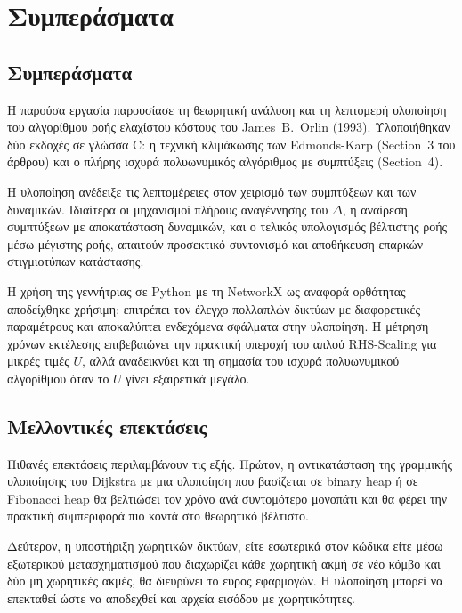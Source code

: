 \documentclass[11pt,a4paper,oneside]{report}
\begin{document}
\chapter{Συμπεράσματα}

\section{Συμπεράσματα}

Η παρούσα εργασία παρουσίασε τη θεωρητική ανάλυση και τη λεπτομερή υλοποίηση του αλγορίθμου ροής ελαχίστου κόστους του \textenglish{James~B.~Orlin} (1993). Υλοποιήθηκαν δύο εκδοχές σε γλώσσα \textenglish{C}: η τεχνική κλιμάκωσης των \textenglish{Edmonds-Karp} (\textenglish{Section~3} του άρθρου) και ο πλήρης ισχυρά πολυωνυμικός αλγόριθμος με συμπτύξεις (\textenglish{Section~4}).

Η υλοποίηση ανέδειξε τις λεπτομέρειες στον χειρισμό των συμπτύξεων και των δυναμικών. Ιδιαίτερα οι μηχανισμοί πλήρους αναγέννησης του $\Delta$, η αναίρεση συμπτύξεων με αποκατάσταση δυναμικών, και ο τελικός υπολογισμός βέλτιστης ροής μέσω μέγιστης ροής, απαιτούν προσεκτικό συντονισμό και αποθήκευση επαρκών στιγμιοτύπων κατάστασης.

Η χρήση της γεννήτριας σε \textenglish{Python} με τη \textenglish{NetworkX} ως αναφορά ορθότητας αποδείχθηκε χρήσιμη: επιτρέπει τον έλεγχο πολλαπλών δικτύων με διαφορετικές παραμέτρους και αποκαλύπτει ενδεχόμενα σφάλματα στην υλοποίηση. Η μέτρηση χρόνων εκτέλεσης επιβεβαιώνει την πρακτική υπεροχή του απλού \textenglish{RHS-Scaling} για μικρές τιμές $U$, αλλά αναδεικνύει και τη σημασία του ισχυρά πολυωνυμικού αλγορίθμου όταν το $U$ γίνει εξαιρετικά μεγάλο.

\section{Μελλοντικές επεκτάσεις}

Πιθανές επεκτάσεις περιλαμβάνουν τις εξής. Πρώτον, η αντικατάσταση της γραμμικής υλοποίησης του \textenglish{Dijkstra} με μια υλοποίηση που βασίζεται σε \textenglish{binary heap} ή σε \textenglish{Fibonacci heap} θα βελτιώσει τον χρόνο ανά συντομότερο μονοπάτι και θα φέρει την πρακτική συμπεριφορά πιο κοντά στο θεωρητικό βέλτιστο.

Δεύτερον, η υποστήριξη χωρητικών δικτύων, είτε εσωτερικά στον κώδικα είτε μέσω εξωτερικού μετασχηματισμού που διαχωρίζει κάθε χωρητική ακμή σε νέο κόμβο και δύο μη χωρητικές ακμές, θα διευρύνει το εύρος εφαρμογών. Η υλοποίηση μπορεί να επεκταθεί ώστε να αποδεχθεί και αρχεία εισόδου με χωρητικότητες.
\end{document}
